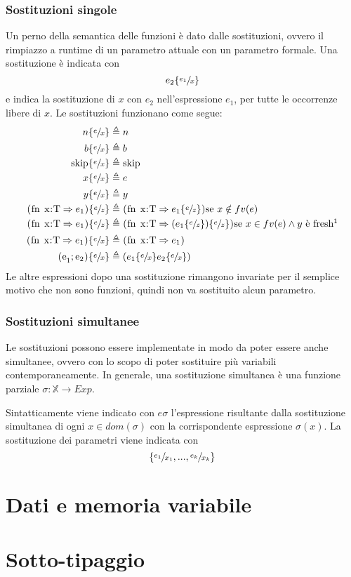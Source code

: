 \documentclass[a4paper, 11pt]{article}
\newcommand{\code}[1]{\textup{\lstinline{#1}}}
\newcommand{\subs}[3]{#1 \lbrace \sfrac{#2}{#3} \rbrace}
\begin{document}
\subsubsection{Sostituzioni singole}
Un perno della semantica delle funzioni è dato dalle sostituzioni, ovvero il rimpiazzo a runtime di un parametro attuale con un parametro formale. Una sostituzione è indicata con \[ \subs{e_2}{e_1}{x}  \] e indica la sostituzione di $x$  con $e_2$ nell'espressione $e_1$, per tutte le occorrenze libere di $x$. Le sostituzioni funzionano come segue: \begin{align*}
	\subs{n}{e}{x} &\triangleq n \\
	\subs{b}{e}{x} &\triangleq b \\
	\subs{\code{skip}}{e}{x} &\triangleq \code{skip} \\
	\subs{x}{e}{x} &\triangleq e \\
	\subs{y}{e}{x} &\triangleq y \\
	\subs{\code{(fn x:T} \Rightarrow e_1 \code{)}}{e}{z} &\triangleq \code{(fn x:T} \Rightarrow \subs{e_1}{e}{z}\code{)} \text{se } x \notin fv(e) \\
	\subs{\code{(fn x:T} \Rightarrow e_1 \code{)}}{e}{z} &\triangleq \code{(fn x:T} \Rightarrow (\subs{e_1}{e}{z})\lbrace \sfrac{e}{z} \rbrace \code{)} \text{se } x \in fv(e) \wedge y \text{ è fresh}\footnotemark \\
	\subs{\code{(fn x:T} \Rightarrow e_1 \code{)}}{e}{x} &\triangleq \code{(fn x:T} \Rightarrow e_1 \code{)} \\
	\subs{\code{(e}_1; \code{e}_2 \code{)}}{e}{x} &\triangleq (\subs{e_1}{e}{x}\subs{e_2}{e}{x})
\end{align*}
Le altre espressioni dopo una sostituzione rimangono invariate per il semplice motivo che non sono funzioni, quindi non va sostituito alcun parametro.

\subsubsection{Sostituzioni simultanee}
Le sostituzioni possono essere implementate in modo da poter essere anche simultanee, ovvero con lo scopo di poter sostituire più variabili contemporaneamente. In generale, una sostituzione simultanea è una funzione parziale $\sigma: \mathbb{X} \to Exp$.

Sintatticamente viene indicato con $e \sigma$ l'espressione risultante dalla sostituzione simultanea di ogni $x \in dom(\sigma)$ con la corrispondente espressione $\sigma(x)$. La sostituzione dei parametri viene indicata con \[ \lbrace \sfrac{e_1}{x_1}, ..., \sfrac{e_k}{x_k} \rbrace \]














\section{Dati e memoria variabile}

\section{Sotto-tipaggio}
\end{document}
